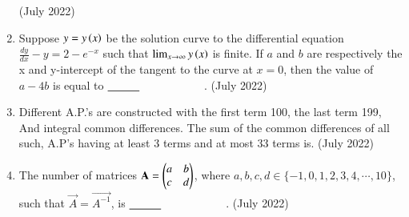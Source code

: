 \documentclass[journal,12pt,onecolumn]{IEEEtran}
\theoremstyle{remark}
\begin{document}
\begin{enumerate}
 \hfill{(July 2022)} 
 \item Suppose $y=y\left(x\right)$ be the solution curve to the differential equation $\frac{dy}{dx}-y=2-e^{-x}$ such that $\lim_{x \to \infty} y\left(x\right)$ is finite. If $a$ and $b$ are respectively the x and y-intercept of the tangent to the curve at $x=0$, then the value of $a-4b$ is equal to $\makebox[3cm][l]{\underline{\hspace{1cm}}}$.
 \hfill{(July 2022)} 
 \item Different A.P.'s are constructed with the first term 100, the last term 199, And integral common differences. The sum of the common differences of all such, A.P's having at least 3 terms and at most 33 terms is.
 \hfill{(July 2022)} 
 \item The number of matrices $\mathbf{A}=\begin{pmatrix}a&b\\c&d\end{pmatrix}$, where $a,b,c,d \in\{-1,0,1,2,3,4,\cdots,10\}$, such that $\vec{A}=\vec{A^{-1}}$, is $\makebox[3cm][l]{\underline{\hspace{1cm}}}$.
 \hfill{(July 2022)} 
    \end{enumerate}
\end{document}
